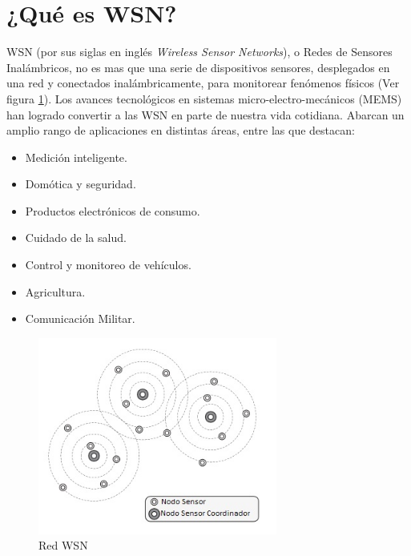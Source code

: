 \section{¿Qué es WSN?}
\label{sec:wsn}

WSN (por sus siglas en inglés \textit{Wireless Sensor Networks}), o Redes de Sensores Inalámbricos, no es mas que una serie de dispositivos sensores, desplegados en una red y conectados inalámbricamente, para monitorear fenómenos físicos (Ver figura \ref{fig:wsn}). Los avances tecnológicos en sistemas micro-electro-mecánicos (MEMS) han logrado convertir a las WSN en parte de nuestra vida cotidiana. Abarcan un amplio rango de aplicaciones en distintas áreas, entre las que destacan:
		\begin{itemize}
			\item Medición inteligente.
			\item Domótica y seguridad.
			\item Productos electrónicos de consumo.
			\item Cuidado de la salud.
			\item Control y monitoreo de vehículos.
			\item Agricultura.
			\item Comunicación Militar.
		\end{itemize}

		
\begin{figure}[h!]
	\centering
    \includegraphics[width=0.7\textwidth]{./Figures/WSN.jpg}
    	\caption{Red WSN}
	\label{fig:wsn}
\end{figure}
		
